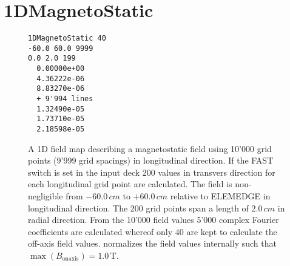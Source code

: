 \section{1DMagnetoStatic}
\label{sec:1DMagnetoStatic}
\begin{figure}[h]
\label{fig:1DMagnetoStatic}
\begin{fmpage}
\begin{verbatim}
1DMagnetoStatic 40
-60.0 60.0 9999
0.0 2.0 199
  0.00000e+00  
  4.36222e-06  
  8.83270e-06  
  + 9'994 lines
  1.32490e-05  
  1.73710e-05  
  2.18598e-05  
\end{verbatim}
\end{fmpage}
\caption[Example of a 1DMagnetoStatic field map]{A 1D field map describing a magnetostatic field using 10'000 grid points (9'999 grid spacings) in longitudinal direction. If the FAST switch is set in the input deck 200 values in transvers direction for each longitudinal grid point are calculated. The field is non-negligible from $-60.0\,cm$ to $+60.0\,cm$ relative to ELEMEDGE in longitudinal direction. The 200 grid points span a length of $2.0\,cm$ in radial direction. From the 10'000 field values 5'000 complex Fourier coefficients are calculated whereof only 40 are kept to calculate the off-axis field values. \opalt normalizes the field values internally such that $\max(B_{\text{onaxis}}) = 1.0 \,\mathrm{T}$.}
\end{figure}
\clearpage

